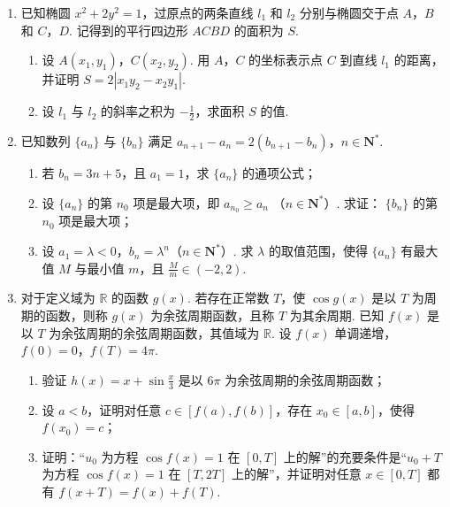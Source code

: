 \begin{description}
\begin{enumerate}[leftmargin=5pt]
        \item 已知椭圆 \(x^{2} + 2y^{2} = 1\)，过原点的两条直线 \(l_{1}\) 和 \(l_{2}\) 分别与椭圆交于点 \(A\)，\(B\) 和 \(C\)，\(D\). 记得到的平行四边形 \(ACBD\) 的面积为 \(S\).
\begin{enumerate}
\item 设 \(A(x_{1}, y_{1})\)，\(C(x_{2}, y_{2})\). 用 \(A\)，\(C\) 的坐标表示点 \(C\) 到直线 \(l_{1}\) 的距离，并证明 \(S = 2|x_{1}y_{2} - x_{2}y_{1}|\).
\item 设 \(l_{1}\) 与 \(l_{2}\) 的斜率之积为 \(-\frac{1}{2}\)，求面积 \(S\) 的值.
\end{enumerate}

        \item 已知数列 \(\{a_{n}\}\) 与 \(\{b_{n}\}\) 满足 \(a_{n + 1} - a_n = 2(b_{n + 1} - b_n)\)，\(n \in \mathbf{N}^*\).
\begin{enumerate}
\item 若 \(b_{n} = 3n + 5\)，且 \(a_{1} = 1\)，求 \(\{a_{n}\}\) 的通项公式；
\item 设 \(\{a_{n}\}\) 的第 \(n_0\) 项是最大项，即 \(a_{n_0} \geqslant a_n\) （\(n \in \mathbf{N}^*\)）. 求证： \(\{b_n\}\) 的第 \(n_0\) 项是最大项；
\item 设 \(a_1 = \lambda < 0\)，\(b_n = \lambda^n\)（\(n \in \mathbf{N}^*\)）. 求 \(\lambda\) 的取值范围，使得 \(\{a_n\}\) 有最大值 \(M\) 与最小值 \(m\)，且 \(\frac{M}{m} \in (-2, 2)\).
\end{enumerate}

        \item 对于定义域为 \(\mathbb{R}\) 的函数 \(g(x)\). 若存在正常数 \(T\)，使 \(\cos g(x)\) 是以 \(T\) 为周期的函数，则称 \(g(x)\) 为余弦周期函数，且称 \(T\) 为其余周期. 已知 \(f(x)\) 是以 \(T\) 为余弦周期的余弦周期函数，其值域为 \(\mathbb{R}\). 设 \(f(x)\) 单调递增，\(f(0) = 0\)，\(f(T) = 4\pi\).
\begin{enumerate}
\item 验证 \( h(x) = x + \sin \frac{x}{3} \) 是以 \( 6\pi \) 为余弦周期的余弦周期函数；
\item 设 \( a < b \)，证明对任意 \( c \in [f(a), f(b)] \)，存在 \( x_0 \in [a, b] \)，使得 \( f(x_0) = c \)；
\item 证明：“\( u_0 \) 为方程 \( \cos f(x) = 1 \) 在 \([0, T]\) 上的解”的充要条件是“\( u_0 + T \) 为方程 \( \cos f(x) = 1 \) 在 \([T, 2T]\) 上的解”，并证明对任意 \( x \in [0, T] \) 都有 \( f(x + T) = f(x) + f(T) \).
\end{enumerate}

    \end{enumerate}

\end{description}


